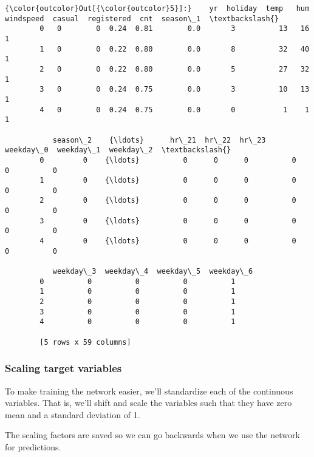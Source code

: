 \documentclass[11pt]{article}
\begin{document}
\begin{Verbatim}[commandchars=\\\{\}]
{\color{outcolor}Out[{\color{outcolor}5}]:}    yr  holiday  temp   hum  windspeed  casual  registered  cnt  season\_1  \textbackslash{}
        0   0        0  0.24  0.81        0.0       3          13   16         1   
        1   0        0  0.22  0.80        0.0       8          32   40         1   
        2   0        0  0.22  0.80        0.0       5          27   32         1   
        3   0        0  0.24  0.75        0.0       3          10   13         1   
        4   0        0  0.24  0.75        0.0       0           1    1         1   
        
           season\_2    {\ldots}      hr\_21  hr\_22  hr\_23  weekday\_0  weekday\_1  weekday\_2  \textbackslash{}
        0         0    {\ldots}          0      0      0          0          0          0   
        1         0    {\ldots}          0      0      0          0          0          0   
        2         0    {\ldots}          0      0      0          0          0          0   
        3         0    {\ldots}          0      0      0          0          0          0   
        4         0    {\ldots}          0      0      0          0          0          0   
        
           weekday\_3  weekday\_4  weekday\_5  weekday\_6  
        0          0          0          0          1  
        1          0          0          0          1  
        2          0          0          0          1  
        3          0          0          0          1  
        4          0          0          0          1  
        
        [5 rows x 59 columns]
\end{Verbatim}
            
    \subsubsection{Scaling target variables}\label{scaling-target-variables}

To make training the network easier, we'll standardize each of the
continuous variables. That is, we'll shift and scale the variables such
that they have zero mean and a standard deviation of 1.

The scaling factors are saved so we can go backwards when we use the
network for predictions.
\end{document}
